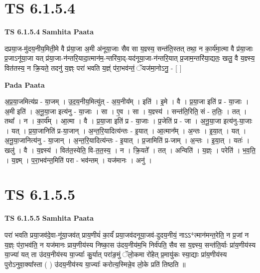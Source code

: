 \documentclass[17pt]{extarticle}
\begin{document}
\section*{ TS 6.1.5.4 }

\textbf{TS 6.1.5.4 } \newline
\textbf{Samhita Paata} \newline

दप्रया॒ज-मु॑दय॒नीय॒मिती॒मे वै प्र॑या॒जा अ॒मी अ॑नूया॒जाः सैव सा य॒ज्ञ्स्य॒ सन्त॑ति॒स्तत् तथा॒ न का॒र्य॑मा॒त्मा वै प्र॑या॒जाः प्र॒जाऽनू॑या॒जा यत् प्र॑या॒जा-न॑न्तरि॒यादा॒त्मान॑म॒-न्तरि॑या॒द्-यद॑नूया॒जा-न॑न्तरि॒यात् प्र॒जाम॒न्तरि॑या॒द्यतः॒ खलु॒ वै य॒ज्ञ्स्य॒ वित॑तस्य॒ न क्रि॒यते॒ तदनु॑ य॒ज्ञ्ः परा॑ भवति य॒ज्ञ्ं प॑रा॒भव॑न्तं॒ ॅयज॑मा॒नोऽनु॒ - [  ] \newline

\textbf{Pada Paata} \newline

अ॒प्र॒या॒जमित्य॑प्र - या॒जम् । उ॒द॒य॒नीय॒मित्यु॑त् - अ॒य॒नीय᳚म् । इति॑ । इ॒मे । वै । प्र॒या॒जा इति॑ प्र - या॒जाः । अ॒मी इति॑ । अ॒नू॒या॒जा इत्य॑नु - या॒जाः । सा । ए॒व । सा । य॒ज्ञ्स्य॑ । सन्त॑ति॒रिति॒ सं - त॒तिः॒ । तत् । तथा᳚ । न । का॒र्य᳚म् । आ॒त्मा । वै । प्र॒या॒जा इति॑ प्र - या॒जाः । प्र॒जेति॑ प्र - जा । अ॒नू॒या॒जा इत्य॑नु-या॒जाः । यत् । प्र॒या॒जानिति॑ प्र-या॒जान् । अ॒न्त॒रि॒यादित्य॑न्तः - इ॒यात् । आ॒त्मान᳚म् । अ॒न्तः । इ॒या॒त् । यत् । अ॒नू॒या॒जानित्य॑नु - या॒जान् । अ॒न्त॒रि॒यादित्य॑न्तः - इ॒यात् । प्र॒जामिति॑ प्र-जाम् । अ॒न्तः । इ॒या॒त् । यतः॑ । खलु॑ । वै । य॒ज्ञ्स्य॑ । वित॑त॒स्येति॒ वि-त॒त॒स्य॒ । न । क्रि॒यते᳚ । तत् । अन्विति॑ । य॒ज्ञ्ः । परेति॑ । भ॒व॒ति॒ । य॒ज्ञ्म् । प॒रा॒भव॑न्त॒मिति॑ परा - भव॑न्तम् । यज॑मानः । अनु॑ ।  \newline




\section*{ TS 6.1.5.5 }

\textbf{TS 6.1.5.5 } \newline
\textbf{Samhita Paata} \newline

परा॑ भवति प्रया॒जव॑दे॒वा-नू॑या॒जव॑त् प्राय॒णीयं॑ का॒र्यं॑ प्रया॒जव॑दनूया॒जव॑-दुदय॒नीयं॒ नाऽऽ*त्मान॑मन्त॒रेति॒ न प्र॒जां न य॒ज्ञ्ः प॑रा॒भव॑ति॒ न यज॑मानः प्राय॒णीय॑स्य निष्का॒स उ॑दय॒नीय॑म॒भि निर्व॑पति॒ सैव सा य॒ज्ञ्स्य॒ सन्त॑ति॒र्याः प्रा॑य॒णीय॑स्य या॒ज्या॑ यत् ता उ॑दय॒नीय॑स्य या॒ज्याः᳚ कु॒र्यात् परा॑ङ॒मुं ॅलो॒कमा रो॑हेत् प्र॒मायु॑कः स्या॒द्याः प्रा॑य॒णीय॑स्य पुरोऽनुवा॒क्या᳚स्ता ( ) उ॑दय॒नीय॑स्य या॒ज्याः᳚ करोत्य॒स्मिन्ने॒व लो॒के प्रति॑ तिष्ठति ॥ \newline
\end{document}
